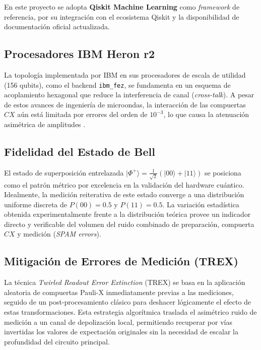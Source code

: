 \noindent En este proyecto se adopta \textbf{Qiskit Machine Learning}
\citep{qiskit2024} como \textit{framework} de referencia, por su
integraci\'on con el ecosistema Qiskit y la disponibilidad de
documentaci\'on oficial actualizada.

\subsection{Procesadores IBM Heron r2}
La topolog\'ia implementada por IBM en sus procesadores de escala de utilidad (156 qubits), como el backend \texttt{ibm\_fez}, se fundamenta en un esquema de acoplamiento hexagonal que reduce la interferencia de canal (\textit{cross-talk}). A pesar de estos avances de ingenier\'ia de microondas, la interacci\'on de las compuertas $CX$ a\'un est\'a limitada por errores del orden de $10^{-3}$, lo que causa la atenuaci\'on asim\'etrica de amplitudes \citep{ibm_quantum_2023}.

\subsection{Fidelidad del Estado de Bell}
El estado de superposici\'on entrelazada $|\Phi^+\rangle = \frac{1}{\sqrt{2}}(|00\rangle + |11\rangle)$ se posiciona como el patr\'on m\'etrico por excelencia en la validaci\'on del hardware cu\'antico. Idealmente, la medici\'on reiterativa de este estado converge a una distribuci\'on uniforme discreta de $P(00) = 0.5$ y $P(11) = 0.5$. La variaci\'on estad\'istica obtenida experimentalmente frente a la distribuci\'on te\'orica provee un indicador directo y verificable del volumen del ruido combinado de preparaci\'on, compuerta $CX$ y medici\'on (\textit{SPAM errors}).

\subsection{Mitigaci\'on de Errores de Medici\'on (TREX)}
La t\'ecnica \textit{Twirled Readout Error Extinction} (TREX) se basa en la aplicaci\'on aleatoria de compuertas Pauli-X inmediatamente previas a las mediciones, seguido de un post-procesamiento cl\'asico para deshacer l\'ogicamente el efecto de estas transformaciones. Esta estrategia algor\'itmica traslada el asim\'etrico ruido de medici\'on a un canal de depolizaci\'on local, permitiendo recuperar por v\'ias invertidas los valores de expectaci\'on originales sin la necesidad de escalar la profundidad del circuito principal.
